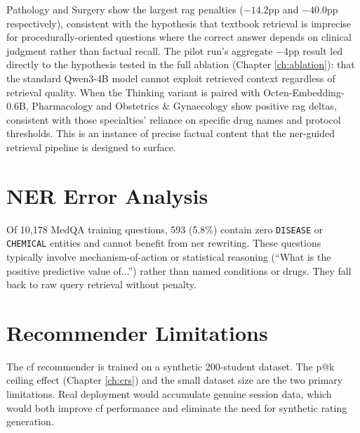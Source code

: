 Pathology and Surgery show the largest \gls{rag} penalties ($-14.2$\gls{pp} and $-40.0$\gls{pp} respectively), consistent with the hypothesis that textbook retrieval is imprecise for procedurally-oriented questions where the correct answer depends on clinical judgment rather than factual recall. The pilot run's aggregate $-4$\gls{pp} result led directly to the hypothesis tested in the full ablation (Chapter \ref{ch:ablation}): that the standard Qwen3-4B model cannot exploit retrieved context regardless of retrieval quality. When the Thinking variant is paired with Octen-Embedding-0.6B, Pharmacology and Obstetrics \& Gynaecology show positive \gls{rag} deltas, consistent with those specialties' reliance on specific drug names and protocol thresholds. This is an instance of precise factual content that the \gls{ner}-guided retrieval pipeline is designed to surface. 

\section{NER Error Analysis}

Of 10,178 MedQA training questions, 593 (5.8\%) contain zero \texttt{DISEASE} or \texttt{CHEMICAL} entities and cannot benefit from \gls{ner} rewriting. These questions typically involve mechanism-of-action or statistical reasoning (``What is the positive predictive value of...'') rather than named conditions or drugs. They fall back to raw query retrieval without penalty. 

\section{Recommender Limitations}

The \gls{cf} recommender is trained on a synthetic 200-student dataset. The \gls{p@k} ceiling effect (Chapter \ref{ch:crs}) and the small dataset size are the two primary limitations. Real deployment would accumulate genuine session data, which would both improve \gls{cf} performance and eliminate the need for synthetic rating generation.